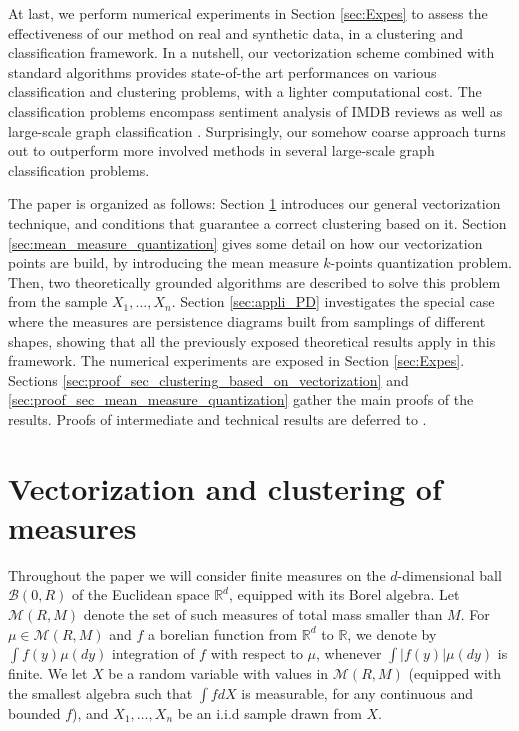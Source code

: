 \documentclass[noinfoline,preprint]{article}
\newcommand{\R}{\mathbb{R}}
\renewcommand{\1}{\mathds 1}
\newcommand{\B}{\mathcal{B}}
\begin{document}
At last, we perform numerical experiments in Section \ref{sec:Expes} to assess the effectiveness of our method on real and synthetic data, in a clustering and classification framework. In a nutshell, our vectorization scheme combined with standard algorithms provides state-of-the art performances on various classification and clustering problems, with a lighter computational cost. The classification problems encompass sentiment analysis of IMDB reviews \cite{imdb} as well as large-scale graph classification \cite{rozemberczki2020api,Yanardag15}. Surprisingly, our somehow coarse approach turns out to outperform more involved methods in several large-scale graph classification problems.

The paper is organized as follows: Section \ref{sec:measures_clustering_vectorization} introduces our general vectorization technique, and  conditions that guarantee a correct clustering based on it. Section \ref{sec:mean_measure_quantization} gives some detail on how our vectorization points are build, by introducing the mean measure $k$-points quantization problem. Then, two theoretically grounded algorithms are described to solve this problem from the sample $X_1, \hdots, X_n$. Section \ref{sec:appli_PD} investigates the special case where the measures are persistence diagrams built from samplings of different shapes, showing that all the previously exposed theoretical results apply in this framework. The numerical experiments are exposed in Section \ref{sec:Expes}.  Sections \ref{sec:proof_sec_clustering_based_on_vectorization} and \ref{sec:proof_sec_mean_measure_quantization} gather the main proofs of the results. Proofs of intermediate and technical results are deferred to  .  

\section{Vectorization and clustering of measures}\label{sec:measures_clustering_vectorization}
Throughout the paper we will consider finite measures on the $d$-dimensional ball $\B(0,R)$ of the Euclidean space $\R^d$, equipped with its Borel algebra. Let  $\mathcal{M}(R,M)$ denote the set of such measures of total mass smaller than $M$. For $\mu \in \mathcal{M}(R,M)$ and $f$ a borelian function from $\mathbb{R}^d$ to $\mathbb{R}$, we denote by $\int f(y) \mu(dy)$ integration of $f$ with respect to $\mu$, whenever $\int |f(y)| \mu(dy) $ is finite. We let $X$ be a random variable with values in $\mathcal{M}(R,M)$ (equipped with the smallest algebra such that $\int f dX$ is measurable, for any continuous and bounded $f$), and $X_1, \hdots, X_n$ be an i.i.d sample drawn from $X$. 
\end{document}
